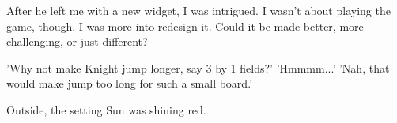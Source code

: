 After he left me with a new widget, I was intrigued. I wasn't
about playing the game, though. I was more into redesign it. Could it
be made better, more challenging, or just different?

\noindent
'Why not make Knight jump longer, say 3 by 1 fields?' \newline
'Hmmmm...' \newline
'Nah, that would make jump too long for such a small board.'

Outside, the setting Sun was shining red.

\vspace*{1.1\baselineskip}
\begin{flushright}
\parbox{0.6\textwidth}{
\emph{\hspace*{\fill}{late November, 1975} \newline
\hspace*{\fill}{Bednja, Croatia}}}
\end{flushright}

\clearpage %
